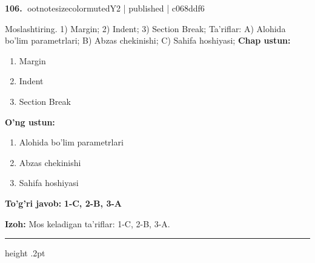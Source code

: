 \documentclass[10pt,a4paper]{article}
\begin{document}
\textbf{\color{ink}106.} {ootnotesizecolor{muted}Y2 | published | c068ddf6}
\par
Moslashtiring.  1) Margin;  2) Indent;  3) Section Break;  Ta'riflar: A) Alohida bo'lim parametrlari;  B) Abzas chekinishi;  C) Sahifa hoshiyasi;
\textbf{Chap ustun:}\begin{enumerate}[label=\arabic*),leftmargin=9mm]
\item Margin
\item Indent
\item Section Break
\end{enumerate}
\textbf{O'ng ustun:}\begin{enumerate}[label=\Alph*),leftmargin=9mm]
\item Alohida bo'lim parametrlari
\item Abzas chekinishi
\item Sahifa hoshiyasi
\end{enumerate}
\begin{tcolorbox}[enhanced,breakable,colback=teal!4,colframe=teal!55!black,boxrule=0.45pt,arc=1.2mm,left=2.8mm,right=2.8mm,top=2mm,bottom=2mm]
\textbf{\color{teal}To'g'ri javob:} \textbf{1-C, 2-B, 3-A}
\par\smallskip
\textbf{Izoh:} Mos keladigan ta'riflar: 1-C, 2-B, 3-A.
\end{tcolorbox}
\vspace{2mm}\hrule height .2pt\vspace{2mm}
\end{document}
